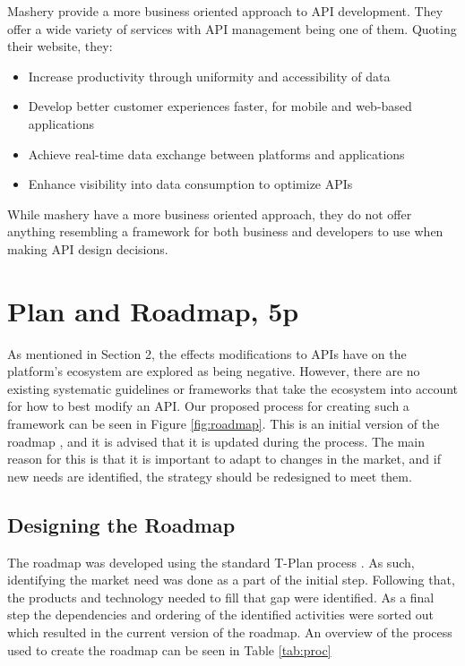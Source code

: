 \documentclass{article}
\begin{document}
Mashery provide a more business oriented approach to API development. They offer a wide variety of services with API management being one of them. Quoting their website, they:

\begin{itemize}
\item Increase productivity through uniformity and accessibility of data
\item Develop better customer experiences faster, for mobile and web-based applications
\item Achieve real-time data exchange between platforms and applications
\item Enhance visibility into data consumption to optimize APIs
\end{itemize}

While mashery have a more business oriented approach, they do not offer anything resembling a framework for both business and developers to use when making API design decisions.

\section{Plan and Roadmap, 5p}
As mentioned in Section 2, the effects modifications to APIs have on the platform’s ecosystem are explored as being negative. However, there are no existing systematic guidelines or frameworks that take the ecosystem into account for how to best modify an API. Our proposed process for creating such a framework can be seen in Figure \ref{fig:roadmap}. This is an initial version of the roadmap \cite{phaal2004technology}, and it is advised that it is updated during the process. The main reason for this is that it is important to adapt to changes in the market, and if new needs are identified, the strategy should be redesigned to meet them. 

\subsection{Designing the Roadmap}
The roadmap was developed using the standard T-Plan process \cite{phaal2004technology}. As such, identifying the market need was done as a part of the initial step. Following that, the products and technology needed to fill that gap were identified. As a final step the dependencies and ordering of the identified activities were sorted out which resulted in the current version of the roadmap. An overview of the process used to create the roadmap can be seen in Table \ref{tab:proc}
\end{document}
